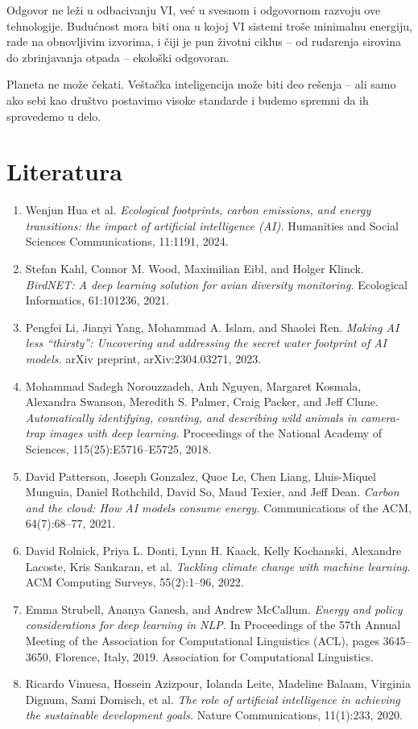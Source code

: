 \documentclass[12pt,a4paper]{article}
\begin{document}
Odgovor ne leži u odbacivanju VI, već u svesnom i odgovornom razvoju ove tehnologije. Budućnost mora biti ona u kojoj VI sistemi troše minimalnu energiju, rade na obnovljivim izvorima, i čiji je pun životni ciklus -- od rudarenja sirovina do zbrinjavanja otpada -- ekološki odgovoran.

Planeta ne može čekati. Veštačka inteligencija može biti deo rešenja -- ali samo ako sebi kao društvo postavimo visoke standarde i budemo spremni da ih sprovedemo u delo.

\clearpage
\section*{Literatura}
\begin{enumerate}[label={\arabic*.},leftmargin=*]
\item Wenjun Hua et al. \textit{Ecological footprints, carbon emissions, and energy transitions: the impact of artificial intelligence (AI).} Humanities and Social Sciences Communications, 11:1191, 2024.
\item Stefan Kahl, Connor M. Wood, Maximilian Eibl, and Holger Klinck. \textit{BirdNET: A deep learning solution for avian diversity monitoring.} Ecological Informatics, 61:101236, 2021.
\item Pengfei Li, Jianyi Yang, Mohammad A. Islam, and Shaolei Ren. \textit{Making AI less ``thirsty'': Uncovering and addressing the secret water footprint of AI models.} arXiv preprint, arXiv:2304.03271, 2023.
\item Mohammad Sadegh Norouzzadeh, Anh Nguyen, Margaret Kosmala, Alexandra Swanson, Meredith S. Palmer, Craig Packer, and Jeff Clune. \textit{Automatically identifying, counting, and describing wild animals in camera-trap images with deep learning.} Proceedings of the National Academy of Sciences, 115(25):E5716--E5725, 2018.
\item David Patterson, Joseph Gonzalez, Quoc Le, Chen Liang, Lluis-Miquel Munguia, Daniel Rothchild, David So, Maud Texier, and Jeff Dean. \textit{Carbon and the cloud: How AI models consume energy.} Communications of the ACM, 64(7):68--77, 2021.
\item David Rolnick, Priya L. Donti, Lynn H. Kaack, Kelly Kochanski, Alexandre Lacoste, Kris Sankaran, et al. \textit{Tackling climate change with machine learning.} ACM Computing Surveys, 55(2):1--96, 2022.
\item Emma Strubell, Ananya Ganesh, and Andrew McCallum. \textit{Energy and policy considerations for deep learning in NLP.} In Proceedings of the 57th Annual Meeting of the Association for Computational Linguistics (ACL), pages 3645--3650, Florence, Italy, 2019. Association for Computational Linguistics.
\item Ricardo Vinuesa, Hossein Azizpour, Iolanda Leite, Madeline Balaam, Virginia Dignum, Sami Domisch, et al. \textit{The role of artificial intelligence in achieving the sustainable development goals.} Nature Communications, 11(1):233, 2020.
\end{enumerate}
\end{document}
